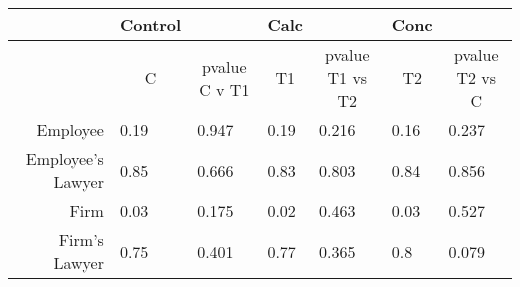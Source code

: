 \begin{tabular}{rrrrrrr}
\toprule
      & \multicolumn{1}{c}{Control} & \multicolumn{1}{c}{} & \multicolumn{1}{c}{Calc} & \multicolumn{1}{c}{} & \multicolumn{1}{c}{Conc} & \multicolumn{1}{c}{} \\
\midrule
      & \multicolumn{1}{c}{C} & \multicolumn{1}{c}{pvalue C v T1} & \multicolumn{1}{c}{T1} & \multicolumn{1}{c}{pvalue T1 vs T2} & \multicolumn{1}{c}{T2} & \multicolumn{1}{c}{pvalue T2 vs C} \\
      \midrule
      \midrule
Employee & \multicolumn{1}{l}{0.19} & \multicolumn{1}{l}{0.947} & \multicolumn{1}{l}{0.19} & \multicolumn{1}{l}{0.216} & \multicolumn{1}{l}{0.16} & \multicolumn{1}{l}{0.237} \\
Employee's Lawyer & \multicolumn{1}{l}{0.85} & \multicolumn{1}{l}{0.666} & \multicolumn{1}{l}{0.83} & \multicolumn{1}{l}{0.803} & \multicolumn{1}{l}{0.84} & \multicolumn{1}{l}{0.856} \\
Firm  & \multicolumn{1}{l}{0.03} & \multicolumn{1}{l}{0.175} & \multicolumn{1}{l}{0.02} & \multicolumn{1}{l}{0.463} & \multicolumn{1}{l}{0.03} & \multicolumn{1}{l}{0.527} \\
Firm's Lawyer & \multicolumn{1}{l}{0.75} & \multicolumn{1}{l}{0.401} & \multicolumn{1}{l}{0.77} & \multicolumn{1}{l}{0.365} & \multicolumn{1}{l}{0.8} & \multicolumn{1}{l}{0.079} \\
\bottomrule
\bottomrule
\end{tabular}%
